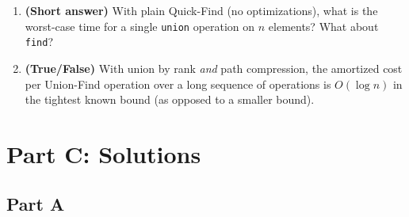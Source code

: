 \documentclass[11pt]{article}
\begin{document}
\begin{enumerate}[label=\textbf{B\arabic*.}, leftmargin=2.2em]
\item \textbf{(Short answer)} With plain Quick-Find (no optimizations), what is the
worst-case time for a single \texttt{union} operation on $n$ elements? What about
\texttt{find}?

\item \textbf{(True/False)} With union by rank \emph{and} path compression, the amortized
cost per Union-Find operation over a long sequence of operations is $O(\log n)$ in the
tightest known bound (as opposed to a smaller bound).

\end{enumerate}

\newpage
\section*{Part C: Solutions}

\subsection*{Part A}
\end{document}
